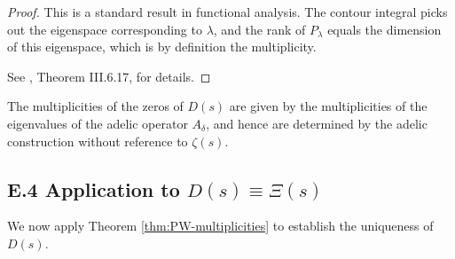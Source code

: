 \begin{proof}
This is a standard result in functional analysis. The contour integral picks out the eigenspace corresponding to $\lambda$, and the rank of $P_\lambda$ equals the dimension of this eigenspace, which is by definition the multiplicity.

See \cite{simon2005}, Theorem III.6.17, for details.
\end{proof}

\begin{corollary}\label{cor:multiplicities-D}
The multiplicities of the zeros of $D(s)$ are given by the multiplicities of the eigenvalues of the adelic operator $A_\delta$, and hence are determined by the adelic construction without reference to $\zeta(s)$.
\end{corollary}

\subsection*{E.4 Application to $D(s) \equiv \Xi(s)$}

We now apply Theorem \ref{thm:PW-multiplicities} to establish the uniqueness of $D(s)$.

